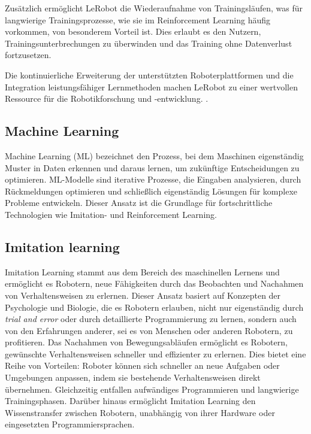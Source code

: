 \documentclass[a4paper, 12pt]{article}
\begin{document}
Zusätzlich ermöglicht LeRobot die Wiederaufnahme von Trainingsläufen, was für langwierige Trainingsprozesse, wie sie im Reinforcement Learning häufig vorkommen, von besonderem Vorteil ist. Dies erlaubt es den Nutzern, Trainingsunterbrechungen zu überwinden und das Training ohne Datenverlust fortzusetzen.

Die kontinuierliche Erweiterung der unterstützten Roboterplattformen und die Integration leistungsfähiger Lernmethoden machen LeRobot zu einer wertvollen Ressource für die Robotikforschung und -entwicklung. \cite{cadene2024lerobot}.


\subsection{Machine Learning} \label{machine_learning}
Machine Learning (ML) bezeichnet den Prozess, bei dem Maschinen eigenständig Muster in Daten erkennen und daraus lernen, um zukünftige Entscheidungen zu optimieren. ML-Modelle sind iterative Prozesse, die Eingaben analysieren, durch Rückmeldungen optimieren und schließlich eigenständig Lösungen für komplexe Probleme entwickeln. Dieser Ansatz ist die Grundlage für fortschrittliche Technologien wie Imitation- und Reinforcement Learning. \cite{grundlagen_sw_entwicklung} 

\subsection{Imitation learning} \label{imitation_learning}
Imitation Learning stammt aus dem Bereich des maschinellen Lernens und ermöglicht es  Robotern, neue Fähigkeiten durch das Beobachten und Nachahmen von Verhaltensweisen zu erlernen. Dieser Ansatz basiert auf Konzepten der Psychologie und Biologie, die es Robotern erlauben, nicht nur eigenständig durch \textit{trial and error} oder durch detaillierte Programmierung zu lernen, sondern auch von den Erfahrungen anderer, sei es von Menschen oder anderen Robotern, zu profitieren.
Das Nachahmen von Bewegungsabläufen ermöglicht es Robotern, gewünschte Verhaltensweisen schneller und effizienter zu erlernen. Dies bietet eine Reihe von Vorteilen: Roboter können sich schneller an neue Aufgaben oder Umgebungen anpassen, indem sie bestehende Verhaltensweisen direkt übernehmen. Gleichzeitig entfallen aufwändiges Programmieren und langwierige Trainingsphasen. Darüber hinaus ermöglicht Imitation Learning den Wissenstransfer zwischen Robotern, unabhängig von ihrer Hardware oder eingesetzten Programmiersprachen. \cite{robot_imitating}
\end{document}
